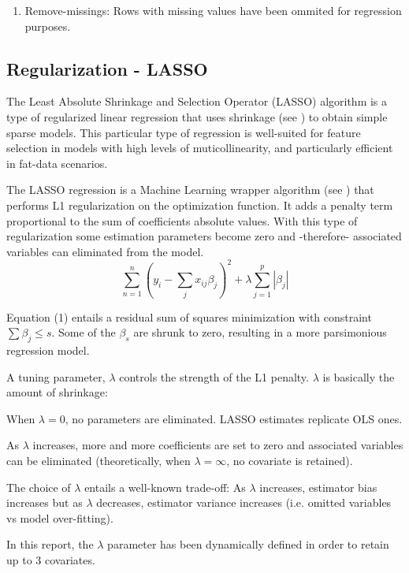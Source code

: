 \documentclass{article}
\begin{document}
\begin{enumerate}
  \item Remove-missings: Rows with missing values have been ommited for regression purposes.

  

\end{enumerate}
\subsection{Regularization - LASSO}
The Least Absolute Shrinkage and Selection Operator (LASSO) algorithm is a type of regularized linear regression that uses shrinkage (see \cite{tibshirani1996}) to obtain simple sparse models. This particular type of regression is well-suited for feature selection in models with high levels of muticollinearity, and particularly efficient in fat-data scenarios.

The LASSO regression is a Machine Learning wrapper algorithm (see \cite{chandrashekar2014}) that performs L1 regularization on the optimization function. It adds a penalty term proportional to the sum of coefficients absolute values. With this type of regularization some estimation parameters become zero and -therefore- associated variables can eliminated from the model.
\begin{equation}
    \sum_{n=1}^{n}(y_i - \sum_{j}x_{ij}\beta_{j})^2 + \lambda \sum_{j=1}^p|\beta_{j}|
\end{equation}

Equation (1) entails a residual sum of squares minimization with constraint $\sum \beta_{j}\leq s$. Some of the $\beta_s$ are shrunk to zero, resulting in a more parsimonious regression model.

A tuning parameter, $\lambda$ controls the strength of the L1 penalty. $\lambda$ is basically the amount of shrinkage:

When $ \lambda = 0$, no parameters are eliminated. LASSO estimates replicate OLS ones.

As $\lambda$ increases, more and more coefficients are set to zero and associated variables can be eliminated (theoretically, when $\lambda = \infty$, no covariate is retained).

The choice of $\lambda$ entails a well-known trade-off:  As $\lambda$ increases, estimator bias increases but as $\lambda$ decreases, estimator variance increases (i.e. omitted variables vs model over-fitting).

In this report, the $\lambda$ parameter has been dynamically defined in order to retain up to 3 covariates.
\end{document}
